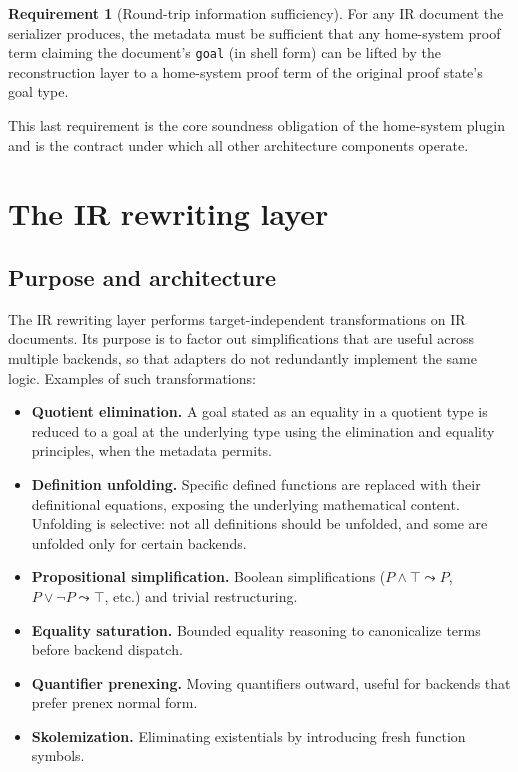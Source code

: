 \documentclass[11pt,letterpaper]{article}
\theoremstyle{definition}
\newtheorem{requirement}{Requirement}[section]
\theoremstyle{remark}
\begin{document}
\begin{requirement}[Round-trip information sufficiency]
For any IR document the serializer produces, the metadata must be
sufficient that any home-system proof term claiming the document's
\texttt{goal} (in shell form) can be lifted by the reconstruction layer
to a home-system proof term of the original proof state's goal type.
\end{requirement}

This last requirement is the core soundness obligation of the
home-system plugin and is the contract under which all other
architecture components operate.

\section{The IR rewriting layer}
\label{sec:rewriting}

\subsection{Purpose and architecture}

The IR rewriting layer performs target-independent transformations on
IR documents. Its purpose is to factor out simplifications that are
useful across multiple backends, so that adapters do not redundantly
implement the same logic. Examples of such transformations:

\begin{itemize}[leftmargin=2em]
  \item \textbf{Quotient elimination.} A goal stated as an equality in a
        quotient type is reduced to a goal at the underlying type using
        the elimination and equality principles, when the metadata
        permits.
  \item \textbf{Definition unfolding.} Specific defined functions are
        replaced with their definitional equations, exposing the
        underlying mathematical content. Unfolding is selective: not all
        definitions should be unfolded, and some are unfolded only for
        certain backends.
  \item \textbf{Propositional simplification.} Boolean simplifications
        ($P \wedge \top \leadsto P$, $P \vee \neg P \leadsto \top$, etc.)
        and trivial restructuring.
  \item \textbf{Equality saturation.} Bounded equality reasoning to
        canonicalize terms before backend dispatch.
  \item \textbf{Quantifier prenexing.} Moving quantifiers outward,
        useful for backends that prefer prenex normal form.
  \item \textbf{Skolemization.} Eliminating existentials by introducing
        fresh function symbols.
\end{itemize}
\end{document}
